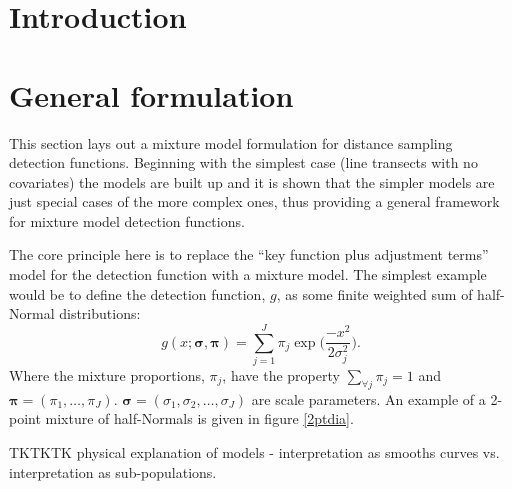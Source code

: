 \section{Introduction}








\section{General formulation}

This section lays out a mixture model formulation for distance sampling detection functions. Beginning with the simplest case (line transects with no covariates) the models are built up and it is shown that the simpler models are just special cases of the more complex ones, thus providing a general framework for mixture model detection functions.

The core principle here is to replace the ``key function plus adjustment terms'' model for the detection function with a mixture model. The simplest example would be to define the detection function, $g$, as some finite weighted sum of half-Normal distributions:
\begin{equation}
g(x;\bm{\sigma},\bm{\pi}) = \sum_{j=1}^J \pi_j \exp \Big( \frac{-x^2}{2 \sigma_j^2}\Big).
\label{mmds-simplemix}
\end{equation}
Where the mixture proportions, $\pi_j$, have the property $\sum_{\forall j}\pi_j=1$ and $\bm{\pi} = (\pi_1, \dots, \pi_J)$. $\bm{\sigma}=(\sigma_1,\sigma_2,\dots,\sigma_J)$ are scale parameters. An example of a 2-point mixture of half-Normals is given in figure \ref{2ptdia}.

TKTKTK physical explanation of models - interpretation as smooths curves vs. interpretation as sub-populations.


